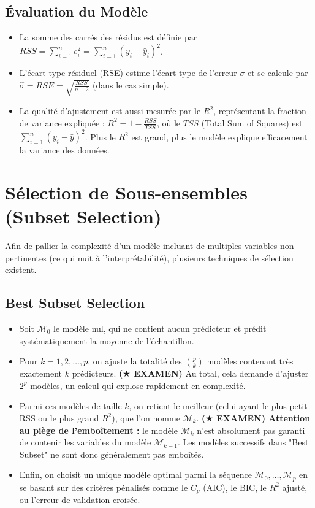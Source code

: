 \subsection{Évaluation du Modèle}
\begin{itemize}
    \item La somme des carrés des résidus est définie par $RSS = \sum_{i=1}^n e_i^2 = \sum_{i=1}^n (y_i - \hat{y}_i)^2$.
    \item L'écart-type résiduel (RSE) estime l'écart-type de l'erreur $\sigma$ et se calcule par $\hat{\sigma} = RSE = \sqrt{\frac{RSS}{n-2}}$ (dans le cas simple).
    \item La qualité d'ajustement est aussi mesurée par le $R^2$, représentant la fraction de variance expliquée : $R^2 = 1 - \frac{RSS}{TSS}$, où le $TSS$ (Total Sum of Squares) est $\sum_{i=1}^n (y_i - \bar{y})^2$. Plus le $R^2$ est grand, plus le modèle explique efficacement la variance des données.
\end{itemize}

\section{Sélection de Sous-ensembles (Subset Selection)}

Afin de pallier la complexité d'un modèle incluant de multiples variables non pertinentes (ce qui nuit à l'interprétabilité), plusieurs techniques de sélection existent.

\subsection{Best Subset Selection}
\begin{itemize}
    \item Soit $\mathcal{M}_0$ le modèle nul, qui ne contient aucun prédicteur et prédit systématiquement la moyenne de l'échantillon.
    \item Pour $k=1, 2, \dots, p$, on ajuste la totalité des $\binom{p}{k}$ modèles contenant très exactement $k$ prédicteurs. \textbf{($\bigstar$ EXAMEN)} Au total, cela demande d'ajuster $2^p$ modèles, un calcul qui explose rapidement en complexité.
    \item Parmi ces modèles de taille $k$, on retient le meilleur (celui ayant le plus petit RSS ou le plus grand $R^2$), que l'on nomme $\mathcal{M}_k$. \textbf{($\bigstar$ EXAMEN) Attention au piège de l'emboîtement :} le modèle $\mathcal{M}_k$ n'est absolument pas garanti de contenir les variables du modèle $\mathcal{M}_{k-1}$. Les modèles successifs dans "Best Subset" ne sont donc généralement pas emboîtés.
    \item Enfin, on choisit un unique modèle optimal parmi la séquence $\mathcal{M}_0, \dots, \mathcal{M}_p$ en se basant sur des critères pénalisés comme le $C_p$ (AIC), le BIC, le $R^2$ ajusté, ou l'erreur de validation croisée.
\end{itemize}

